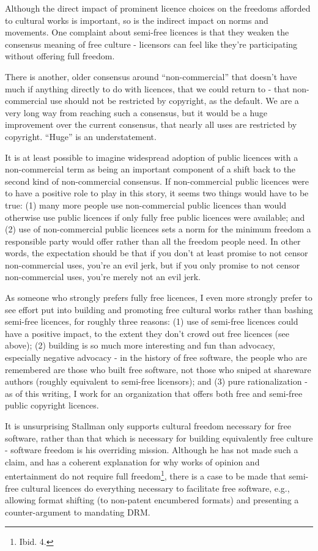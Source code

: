 Although the direct impact of prominent licence choices on the freedoms
af\hbox{}forded to cultural works is important, so is the indirect impact on
norms and movements. One complaint about semi-free licences is that they weaken
the consensus meaning of free culture - licensors can feel like they're
participating without of\hbox{}fering full freedom.

There is another, older consensus around ``non-commercial'' that doesn't have
much if anything directly to do with licences, that we could return to - that
non-commercial use should not be restricted by copyright, as the default. We are
a very long way from reaching such a consensus, but it would be a huge
improvement over the current consensus, that nearly all uses are restricted by
copyright. ``Huge'' is an understatement.

It is at least possible to imagine widespread adoption of public licences with a
non-commercial term as being an important component of a shift back to the
second kind of non-commercial consensus. If non-commercial public licences were
to have a positive role to play in this story, it seems two things would have to
be true: (1) many more people use non-commercial public licences than would
otherwise use public licences if only fully free public licences were available;
and (2) use of non-commercial public licences sets a norm for the minimum
freedom a responsible party would of\hbox{}fer rather than all the freedom
people need.  In other words, the expectation should be that if you don't at
least promise to not censor non-commercial uses, you're an evil jerk, but if you
only promise to not censor non-commercial uses, you're merely not an evil jerk.

As someone who strongly prefers fully free licences, I even more strongly prefer
to see ef\hbox{}fort put into building and promoting free cultural works rather
than bashing semi-free licences, for roughly three reasons: (1) use of semi-free
licences could have a positive impact, to the extent they don't crowd out free
licences (see above); (2) building is so much more interesting and fun than
advocacy, especially negative advocacy - in the history of free software, the
people who are remembered are those who built free software, not those who
sniped at shareware authors (roughly equivalent to semi-free licensors); and (3)
pure rationalization - as of this writing, I work for an organization that
of\hbox{}fers both free and semi-free public copyright licences.

It is unsurprising Stallman only supports cultural freedom necessary for free
software, rather than that which is necessary for building equivalently free
culture - software freedom is his overriding mission. Although he has not made
such a claim, and has a coherent explanation for why works of opinion and
entertainment do not require full freedom\footnote{Ibid. 4.}, there is a case to
be made that semi-free cultural licences do everything necessary to facilitate
free software, e.g., allowing format shifting (to non-patent encumbered formats)
and presenting a counter-argument to mandating DRM.

